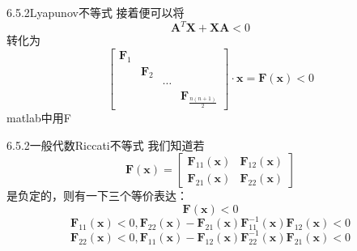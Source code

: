 \documentclass[12pt]{beamer}
\begin{document}
\begin{frame}[allowframebreaks]{6.5.2Lyapunov不等式}
接着便可以将\[\boldsymbol{A}^{T}\boldsymbol{X}+\boldsymbol{X}\boldsymbol{A}< 0\]
转化为\[\begin{bmatrix}
\boldsymbol{F}_{1} &  &  & \\ 
& \boldsymbol{F}_{2} &  & \\ 
&  & \cdots  & \\ 
&  &  & \boldsymbol{F}_{\frac{n\left ( n+1\right )}{2}}
\end{bmatrix}\cdot \boldsymbol{x}=\boldsymbol{F}\left ( \boldsymbol{x}\right )< 0 \]
matlab中用F
\end{frame}

\begin{frame}[allowframebreaks]{6.5.2一般代数Riccati不等式}
我们知道若\[\boldsymbol{F}\left ( \boldsymbol{x}\right )=\begin{bmatrix}
\boldsymbol{F}_{11}\left ( \boldsymbol{x}\right ) & \boldsymbol{F}_{12}\left ( \boldsymbol{x}\right )\\ 
\boldsymbol{F}_{21}\left ( \boldsymbol{x}\right ) & \boldsymbol{F}_{22}\left ( \boldsymbol{x}\right )
\end{bmatrix}\]是负定的，则有一下三个等价表达：
\[\boldsymbol{F}\left ( \boldsymbol{x}\right )< 0\]\[\boldsymbol{F}_{11}\left ( \boldsymbol{x}\right )< 0,\boldsymbol{F}_{22}\left ( \boldsymbol{x}\right )-\boldsymbol{F}_{21}\left ( \boldsymbol{x}\right )\boldsymbol{F}_{11}^{-1}\left ( \boldsymbol{x}\right )\boldsymbol{F}_{12}\left ( \boldsymbol{x}\right )< 0\]\[\boldsymbol{F}_{22}\left ( \boldsymbol{x}\right )< 0,\boldsymbol{F}_{11}\left ( \boldsymbol{x}\right )-\boldsymbol{F}_{12}\left ( \boldsymbol{x}\right )\boldsymbol{F}_{22}^{-1}\left ( \boldsymbol{x}\right )\boldsymbol{F}_{21}\left ( \boldsymbol{x}\right )< 0\]
\end{frame}
\end{document}

